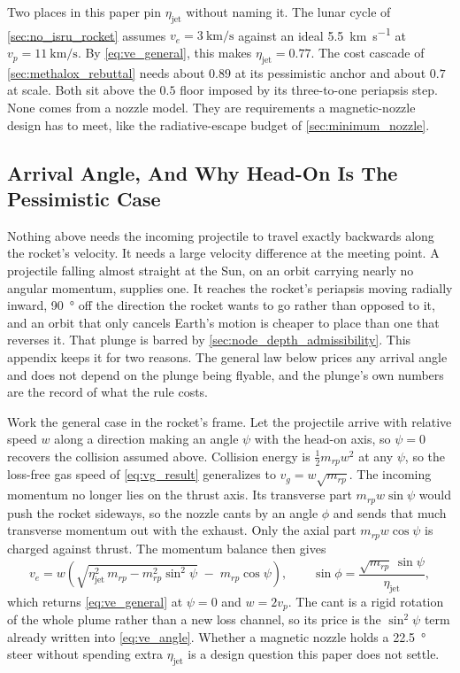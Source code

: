 \documentclass{article}
\begin{document}
Two places in this paper pin $\eta_{\mathrm{jet}}$ without naming it. The lunar cycle of \autoref{sec:no_isru_rocket} assumes $v_e = \SI{3}{\kilo\meter\per\second}$ against an ideal \SI{5.5}{\kilo\meter\per\second} at $v_p = \SI{11}{\kilo\meter\per\second}$. By \autoref{eq:ve_general}, this makes $\eta_{\mathrm{jet}} = 0.77$. The cost cascade of \autoref{sec:methalox_rebuttal} needs about $0.89$ at its pessimistic anchor and about $0.7$ at scale. Both sit above the $0.5$ floor imposed by its three-to-one periapsis step. None comes from a nozzle model. They are requirements a magnetic-nozzle design has to meet, like the radiative-escape budget of \autoref{sec:minimum_nozzle}.

\subsection{Arrival Angle, And Why Head-On Is The Pessimistic Case}\label{sec:arrival_angle}
Nothing above needs the incoming projectile to travel exactly backwards along the rocket's velocity. It needs a large velocity difference at the meeting point. A projectile falling almost straight at the Sun, on an orbit carrying nearly no angular momentum, supplies one. It reaches the rocket's periapsis moving radially inward, \SI{90}{\degree} off the direction the rocket wants to go rather than opposed to it, and an orbit that only cancels Earth's motion is cheaper to place than one that reverses it. That plunge is barred by \autoref{sec:node_depth_admissibility}. This appendix keeps it for two reasons. The general law below prices any arrival angle and does not depend on the plunge being flyable, and the plunge's own numbers are the record of what the rule costs.

Work the general case in the rocket's frame. Let the projectile arrive with relative speed $w$ along a direction making an angle $\psi$ with the head-on axis, so $\psi = 0$ recovers the collision assumed above. Collision energy is $\tfrac{1}{2}m_{rp}w^2$ at any $\psi$, so the loss-free gas speed of \autoref{eq:vg_result} generalizes to $v_g = w\sqrt{m_{rp}}$. The incoming momentum no longer lies on the thrust axis. Its transverse part $m_{rp}w\sin\psi$ would push the rocket sideways, so the nozzle cants by an angle $\phi$ and sends that much transverse momentum out with the exhaust. Only the axial part $m_{rp}w\cos\psi$ is charged against thrust. The momentum balance then gives
\begin{equation}
v_e = w\left(\sqrt{\eta_{\mathrm{jet}}^2\,m_{rp} - m_{rp}^2\sin^2\psi}\;-\;m_{rp}\cos\psi\right),
\qquad
\sin\phi = \frac{\sqrt{m_{rp}}\,\sin\psi}{\eta_{\mathrm{jet}}},
\label{eq:ve_angle}
\end{equation}
which returns \autoref{eq:ve_general} at $\psi = 0$ and $w = 2v_p$. The cant is a rigid rotation of the whole plume rather than a new loss channel, so its price is the $\sin^2\psi$ term already written into \autoref{eq:ve_angle}. Whether a magnetic nozzle holds a \SI{22.5}{\degree} steer without spending extra $\eta_{\mathrm{jet}}$ is a design question this paper does not settle.
\end{document}
